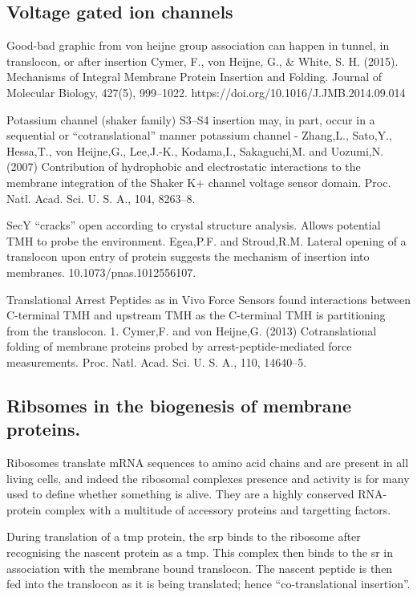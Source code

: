 \subsection{Voltage gated ion channels}

Good\--bad graphic from von heijne group association can happen in tunnel, in translocon, or after insertion Cymer, F., von  Heijne, G., \& White, S. H. (2015). Mechanisms of Integral Membrane Protein Insertion and Folding. Journal of Molecular Biology, 427(5), 999–1022. https://doi.org/10.1016/J.JMB.2014.09.014

Potassium channel (shaker family) S3–S4 insertion may, in part, occur in a sequential or “cotranslational” manner potassium channel - Zhang,L., Sato,Y., Hessa,T., von Heijne,G., Lee,J.-K., Kodama,I., Sakaguchi,M. and Uozumi,N. (2007) Contribution of hydrophobic and electrostatic interactions to the membrane integration of the Shaker K+ channel voltage sensor domain. Proc. Natl. Acad. Sci. U. S. A., 104, 8263–8.

SecY “cracks” open according to crystal structure analysis. Allows potential TMH to probe the environment. Egea,P.F. and Stroud,R.M. Lateral opening of a translocon upon entry of protein suggests the mechanism of insertion into membranes. 10.1073/pnas.1012556107.

Translational Arrest Peptides as in Vivo Force Sensors found interactions between C-terminal TMH and upstream TMH as the C-terminal TMH is partitioning from the translocon. 1. Cymer,F. and von Heijne,G. (2013) Cotranslational folding of membrane proteins probed by arrest-peptide-mediated force measurements. Proc. Natl. Acad. Sci. U. S. A., 110, 14640–5.

\subsection{Ribsomes in the biogenesis of membrane proteins.}
Ribosomes translate mRNA sequences to amino acid chains and are present in all living cells, and indeed the ribosomal complexes presence and activity is for many used to define whether something is alive.
They are a highly conserved RNA-protein complex with a multitude of accessory proteins and targetting factors.

During translation of a \gls{tmp} protein, the \gls{srp} binds to the ribosome after recognising the nascent protein as a \gls{tmp}.
This complex then binds to the \gls{sr} in association with the membrane bound translocon.
The nascent peptide is then fed into the translocon as it is being translated; hence ``co-translational insertion''.


